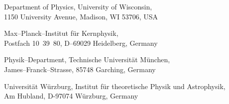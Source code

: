 \documentclass[12pt,a4paper]{article}
\newcommand{\GLOBES}{{\sf GLoBES}}
\newcommand{\GLOBESN}{{\sf GLoBES~3.0}}
\begin{document}
\begin{titlepage}
{\begin{center}
\footnotemark[1]%
       Department of Physics, University of Wisconsin, \\
       1150 University Avenue, Madison, WI 53706, USA

\vspace*{1mm}

\footnotemark[2]%
       Max--Planck--Institut f\"ur Kernphysik,  \\
       Postfach 10~39~80, D--69029 Heidelberg, Germany 

\vspace*{1mm}

\footnotemark[3]%
       Physik--Department, Technische Universit\"at M\"unchen, \\
       James--Franck--Strasse, 85748 Garching, Germany

\vspace*{1mm}

\footnotemark[4]%
       Universit\"at W\"urzburg, 
       Institut f\"ur theoretische Physik und Astrophysik, \\
       Am Hubland, D-97074 W\"urzburg, Germany

\end{center}}

\vspace*{1cm}


\begin{abstract}
We present Version 3.0 of the GLoBES (``General Long Baseline Experiment Simulator'') software, which is
a simulation tool for short- and long-baseline neutrino oscillation experiments. As new features, \GLOBESN\ allows the simulation of experiments with multiple discrete sources and detectors by the 
concept of user-defined systematics.
In addition, the combination with external information, such as from different experiment classes, is 
simplified by the concept of user-defined priors. As far as the probability calculation is concerned, \GLOBES\ 
now provides an interface for the inclusion of non-standard physics without re-compilation of the software. 
The set of experiment descriptions coming with \GLOBES\ has been updated. For example, built-in fluxes are now
provided for the simulation of beta beams.
\end{abstract}


\vspace*{.5cm}


\end{titlepage}

\newpage

\renewcommand{\thefootnote}{\arabic{footnote}}
\setcounter{footnote}{0}
\end{document}
